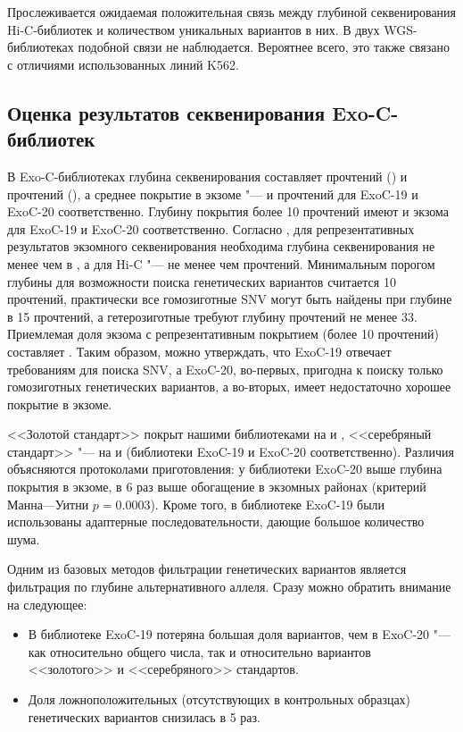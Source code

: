 \documentclass[a4paper,14pt]{extarticle}
\newcommand{\mln}{млн}
\begin{document}
Прослеживается ожидаемая положительная связь между глубиной секвенирования Hi-C\hyp{}библиотек и количеством уникальных вариантов в них.
В двух WGS\hyp{}библиотеках подобной связи не наблюдается.
Вероятнее всего, это также связано с отличиями использованных линий K562.

\subsection{Оценка результатов секвенирования Exo-C\hyp{}библиотек}

В Exo-C\hyp{}библиотеках глубина секвенирования составляет \numprint[\mln]{136.6} прочтений () и \numprint[\mln]{109.4} прочтений (), а среднее покрытие в экзоме "---  и  прочтений для ExoC-19 и ExoC-20 соответственно.
Глубину покрытия более 10 прочтений имеют  и  экзома для ExoC-19 и ExoC-20 соответственно.
Согласно \citet{Sims_2014}, для репрезентативных результатов экзомного секвенирования необходима глубина секвенирования не менее чем в , а для Hi-C "--- не менее чем \numprint[\mln]{100} прочтений.
Минимальным порогом глубины для возможности поиска генетических вариантов считается 10 прочтений, практически все гомозиготные SNV могут быть найдены при глубине в 15 прочтений, а гетерозиготные требуют глубину прочтений не менее 33.
Приемлемая доля экзома с репрезентативным покрытием (более 10 прочтений) составляет .
Таким образом, можно утверждать, что ExoC-19 отвечает требованиям для поиска SNV, а ExoC-20, во-первых, пригодна к поиску только гомозиготных генетических вариантов, а во-вторых, имеет недостаточно хорошее покрытие в экзоме.

<<Золотой стандарт>> покрыт нашими библиотеками на  и , <<серебряный стандарт>> "--- на  и  (библиотеки ExoC-19 и ExoC-20 соответственно).
Различия объясняются протоколами приготовления: у библиотеки ExoC-20 выше глубина покрытия в экзоме, в 6 раз выше обогащение в экзомных районах (критерий Манна---Уитни $p = 0.0003$).
Кроме того, в библиотеке ExoC-19 были использованы адаптерные последовательности, дающие большое количество шума.

Одним из базовых методов фильтрации генетических вариантов является фильтрация по глубине альтернативного аллеля.
Сразу можно обратить внимание на следующее:

\begin{itemize}
	\item В библиотеке ExoC-19 потеряна большая доля вариантов, чем в ExoC-20 "--- как относительно общего числа, так и относительно вариантов <<золотого>> и <<серебряного>> стандартов.
	\item Доля ложноположительных (отсутствующих в контрольных образцах) генетических вариантов снизилась в 5 раз.
\end{itemize}
\end{document}
